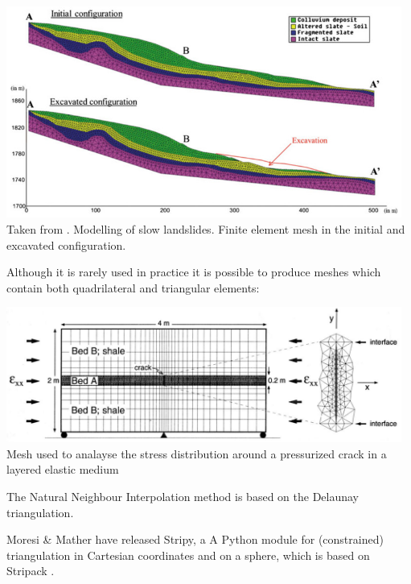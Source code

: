 \begin{center}
\includegraphics[width=13cm]{images/meshes/fegh14}\\
{\captionfont Taken from \cite{fegh14}. Modelling of slow
landslides. Finite element mesh in the initial and excavated configuration.}
\end{center}

Although it is rarely used in practice it is possible to produce meshes which contain 
both quadrilateral and triangular elements:
\begin{center}
\includegraphics[width=13cm]{images/meshes/fige95}\\
{\captionfont Mesh used to analayse the stress distribution around a pressurized crack in a layered 
elastic medium \cite{fige95}}
\end{center}

\Literature \cite{musd15}\cite{vemm09}

\begin{remark} 
The Natural Neighbour Interpolation method \cite{sabm95,sabm96} is based on the Delaunay triangulation.
\end{remark}

\begin{remark} 
Moresi \& Mather \cite{moma19} have released Stripy, a A Python module for (constrained) triangulation
in Cartesian coordinates and on a sphere, which is based on Stripack \cite{renk96,renk97}.
\end{remark}

